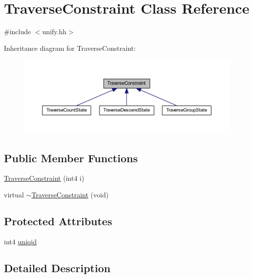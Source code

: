 \hypertarget{class_traverse_constraint}{}\section{Traverse\+Constraint Class Reference}
\label{class_traverse_constraint}


{\ttfamily \#include $<$unify.\+hh$>$}



Inheritance diagram for Traverse\+Constraint\+:
\nopagebreak
\begin{figure}[H]
\begin{center}
\leavevmode
\includegraphics[width=350pt]{class_traverse_constraint__inherit__graph}
\end{center}
\end{figure}
\subsection*{Public Member Functions}
\begin{DoxyCompactItemize}
\item 
\mbox{\hyperlink{class_traverse_constraint_a55ddc33686bfcc6c329737b8dc49068c}{Traverse\+Constraint}} (int4 i)
\item 
virtual \mbox{\hyperlink{class_traverse_constraint_a9e5c1ad1d4cc4c9db08cba9fa5e8f009}{$\sim$\+Traverse\+Constraint}} (void)
\end{DoxyCompactItemize}
\subsection*{Protected Attributes}
\begin{DoxyCompactItemize}
\item 
int4 \mbox{\hyperlink{class_traverse_constraint_a359ab5546ee64533599d44d171637306}{uniqid}}
\end{DoxyCompactItemize}


\subsection{Detailed Description}



